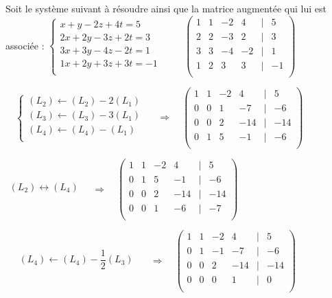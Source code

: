 \begin{exemple}



Soit le système suivant à résoudre ainsi que la matrice augmentée qui lui est associée : 
$
\left\{
\begin{array}{l}
x   + y  -2 z +4t = 5 \\
2x + 2y -3 z +2t = 3 \\
3x + 3y -4 z -2t = 1 \\
1x + 2y +3 z +3t = -1 \\
\end{array}
\right.
$
$\quad\quad
\begin{pmatrix}
1 & 1 & -2 & 4 & | & 5 \\
2 & 2 & -3 & 2 & | &  3 \\
3 & 3 & -4 &  -2& | & 1 \\
1 & 2 & 3 & 3 & | & -1 \\
\end{pmatrix}$

$\quad \left\{
\begin{array}{l}
(L_2) \leftarrow (L_2) - 2 (L_1) \\ 
(L_3) \leftarrow (L_3) - 3 (L_1) \\
(L_4) \leftarrow (L_4) -  (L_1) \\
\end{array}
\right.\quad$
$\Longrightarrow \quad
\begin{pmatrix}
1 & 1 & -2 & 4 & | & 5 \\
0 & 0 & 1 & -7 & | &  -6 \\
0 & 0 & 2 &  -14& | & -14 \\
0 & 1 & 5 & -1 & | & -6 \\
\end{pmatrix}
$

$
\begin{array}{l}
(L_2) \leftrightarrow (L_4)  \\ 
\end{array}
\quad\Longrightarrow \quad
\begin{pmatrix}
1 & 1 & -2 & 4 & | & 5 \\
0 & 1 & 5 & -1 & | & -6 \\
0 & 0 & 2 &  -14& | & -14 \\
0 & 0 & 1 & -6 & | &  -7 \\
\end{pmatrix}
$


$\quad
\begin{array}{l}
(L_4) \leftarrow (L_4) - \dfrac{1}{2} (L_3)\\ 
\end{array}
\quad $
$\Longrightarrow \quad
\begin{pmatrix}
1 & 1 & -2 & 4 & | & 5 \\
0 & 1 & -1 & -7 & | & -6 \\
0 & 0 & 2 &  -14& | & -14 \\
0 & 0 & 0 & 1 & | &  0 \\
\end{pmatrix}
$


\end{exemple}


